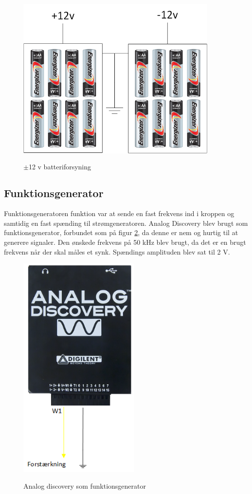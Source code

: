 \begin{figure}[H]
\centering
{\includegraphics[width=10cm]
{Figure/12vbatteri}}
\caption{$\pm$12 v batteriforsyning}
\label{fig:12vbatteri}
\end{figure}

\subsection{Funktionsgenerator}
Funktionsgeneratoren funktion var at sende en fast frekvens ind i kroppen og samtidig en fast spænding til strømgeneratoren. 
Analog Discovery blev brugt som funktionsgenerator, forbundet som på figur \ref{fig:analogdis}, da denne er nem og hurtig til at generere signaler. Den ønskede frekvens på 50 kHz blev brugt, da det er en brugt frekvens når der skal måles et synk\cite{Kusuhara2004}. Spændings amplituden blev sat til 2 V. 

\begin{figure}[H]
\centering
{\includegraphics[width=6cm]
{Figure/analogdis}}
\caption{Analog discovery som funktionsgenerator}
\label{fig:analogdis}
\end{figure}


